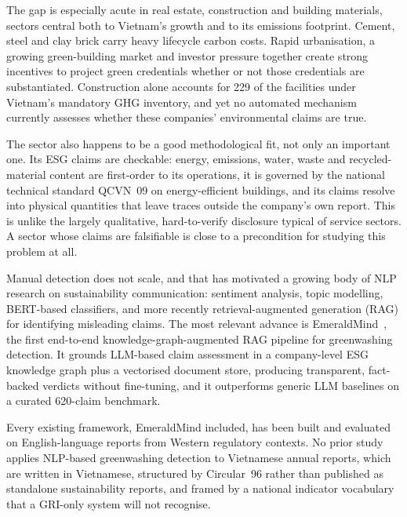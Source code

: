 \documentclass[fontsize=12pt,oneside,headings=small]{scrreprt}
\begin{document}
The gap is especially acute in real estate, construction and building materials, sectors central both to Vietnam's growth and to its emissions footprint. Cement, steel and clay brick carry heavy lifecycle carbon costs. Rapid urbanisation, a growing green-building market and investor pressure together create strong incentives to project green credentials whether or not those credentials are substantiated. Construction alone accounts for 229 of the facilities under Vietnam's mandatory GHG inventory, and yet no automated mechanism currently assesses whether these companies' environmental claims are true.

The sector also happens to be a good methodological fit, not only an important one. Its ESG claims are checkable: energy, emissions, water, waste and recycled-material content are first-order to its operations, it is governed by the national technical standard QCVN~09 on energy-efficient buildings, and its claims resolve into physical quantities that leave traces outside the company's own report. This is unlike the largely qualitative, hard-to-verify disclosure typical of service sectors. A sector whose claims are falsifiable is close to a precondition for studying this problem at all.

Manual detection does not scale, and that has motivated a growing body of NLP research on sustainability communication: sentiment analysis, topic modelling, BERT-based classifiers, and more recently retrieval-augmented generation (RAG) for identifying misleading claims. The most relevant advance is EmeraldMind~\cite{kaoukis2026emeraldmind}, the first end-to-end knowledge-graph-augmented RAG pipeline for greenwashing detection. It grounds LLM-based claim assessment in a company-level ESG knowledge graph plus a vectorised document store, producing transparent, fact-backed verdicts without fine-tuning, and it outperforms generic LLM baselines on a curated 620-claim benchmark.

Every existing framework, EmeraldMind included, has been built and evaluated on English-language reports from Western regulatory contexts. No prior study applies NLP-based greenwashing detection to Vietnamese annual reports, which are written in Vietnamese, structured by Circular~96 rather than published as standalone sustainability reports, and framed by a national indicator vocabulary that a GRI-only system will not recognise.
\end{document}
